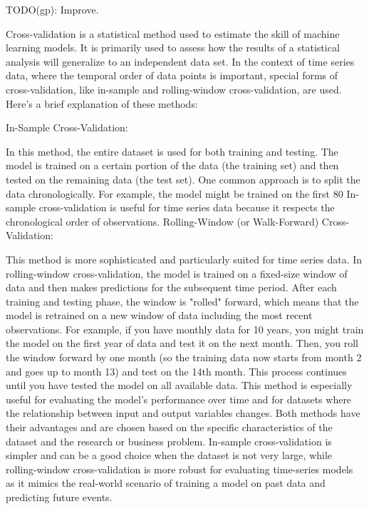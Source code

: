 \documentclass[11pt, reqno]{amsart}
\theoremstyle{definition}
\theoremstyle{remark}
\begin{document}
TODO(gp): Improve.

Cross-validation is a statistical method used to estimate the skill of machine
learning models. It is primarily used to assess how the results of a
statistical analysis will generalize to an independent data set. In the context
of time series data, where the temporal order of data points is important,
special forms of cross-validation, like in-sample and rolling-window
cross-validation, are used. Here's a brief explanation of these methods:

In-Sample Cross-Validation:

In this method, the entire dataset is used for both training and testing. The
model is trained on a certain portion of the data (the training set) and then
tested on the remaining data (the test set). One common approach is to split
the data chronologically. For example, the model might be trained on the first
80%
In-sample cross-validation is useful for time series data because it respects
the chronological order of observations. Rolling-Window (or Walk-Forward)
Cross-Validation:

This method is more sophisticated and particularly suited for time series data.
In rolling-window cross-validation, the model is trained on a fixed-size window
of data and then makes predictions for the subsequent time period.
After each training and testing phase, the window is "rolled" forward, which
means that the model is retrained on a new window of data including the most
recent observations.
For example, if you have monthly data for 10 years, you might train the model
on the first year of data and test it on the next month. Then, you roll the
window forward by one month (so the training data now starts from month 2 and
goes up to month 13) and test on the 14th month. This process continues until
you have tested the model on all available data.
This method is especially useful for evaluating the model's performance over
time and for datasets where the relationship between input and output variables
changes.
Both methods have their advantages and are chosen based on the specific
characteristics of the dataset and the research or business problem. In-sample
cross-validation is simpler and can be a good choice when the dataset is not
very large, while rolling-window cross-validation is more robust for evaluating
time-series models as it mimics the real-world scenario of training a model on
past data and predicting future events.
\end{document}
